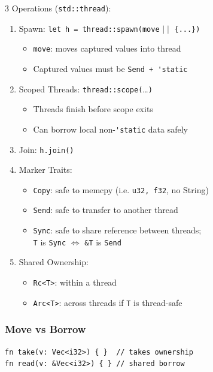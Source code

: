 \documentclass[12pt, a4paper]{article}
\begin{document}
\begin{multicols*}{3}
Operations (\lstinline|std::thread|):
\begin{enumerate}[\roman*.]
  \item Spawn: \lstinline|let h = thread::spawn(move| $\mid\mid$ \lstinline|{...})|
  \begin{itemize}[leftmargin=*]\vspace{3pt}
    \item \lstinline|move|: moves captured values into thread
    \item Captured values must be \lstinline|Send + 'static|
  \end{itemize}
  \item Scoped Threads: \lstinline|thread::scope(|\dots\lstinline|)|
  \begin{itemize}[leftmargin=*]\vspace{3pt}
    \item Threads finish before scope exits
    \item Can borrow local non-\lstinline|'static| data safely
  \end{itemize}
  \item Join: \lstinline|h.join()|
  \item Marker Traits:
    \begin{itemize}[leftmargin=*]\vspace{3pt}
    \item \lstinline|Copy|: safe to memcpy (i.e. \lstinline|u32, f32|, no String) 
    \item \lstinline|Send|: safe to transfer to another thread 
    \item \lstinline|Sync|: safe to share reference between threads;\\
      \lstinline|T| is \lstinline|Sync| $\iff$ \lstinline|&T| is \lstinline|Send|
  \end{itemize}
  \item Shared Ownership:
    \begin{itemize}[leftmargin=*]\vspace{3pt}
      \item \lstinline|Rc<T>|: within a thread
      \item \lstinline|Arc<T>|: across threads if \lstinline{T} is thread-safe
  \end{itemize}
\end{enumerate}
\vspace{-1em}
\colbreak
\subsubsection{Move vs Borrow}
\begin{lstlisting}[style=rust,basicstyle=\ttfamily\scriptsize]
fn take(v: Vec<i32>) { }  // takes ownership
fn read(v: &Vec<i32>) { } // shared borrow


\end{lstlisting}
\end{multicols*}
\end{document}
